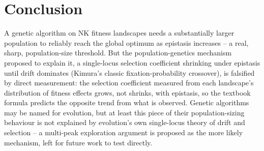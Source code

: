 \section{Conclusion}

A genetic algorithm on NK fitness landscapes needs a substantially larger
population to reliably reach the global optimum as epistasis increases --
a real, sharp, population-size threshold. But the population-genetics
mechanism proposed to explain it, a single-locus selection coefficient
shrinking under epistasis until drift dominates (Kimura's classic
fixation-probability crossover), is falsified by direct measurement: the
selection coefficient measured from each landscape's distribution of
fitness effects grows, not shrinks, with epistasis, so the textbook
formula predicts the opposite trend from what is observed. Genetic
algorithms may be named for evolution, but at least this piece of their
population-sizing behaviour is not explained by evolution's own
single-locus theory of drift and selection -- a multi-peak exploration
argument is proposed as the more likely mechanism, left for future work to
test directly.
